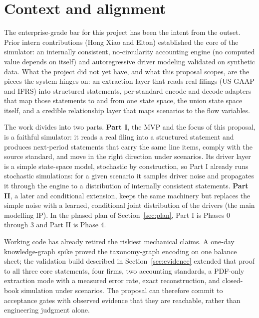 \documentclass[11pt]{article}
\begin{document}
\tableofcontents

\section{Context and alignment}
The enterprise-grade bar for this project has been the intent from the outset. Prior intern contributions (Hong Xiao and Elton) established the core of the simulator: an internally consistent, no-circularity accounting engine (no computed value depends on itself) and autoregressive driver modeling validated on synthetic data. What the project did not yet have, and what this proposal scopes, are the pieces the system hinges on: an extraction layer that reads real filings (US GAAP and IFRS) into structured statements, per-standard encode and decode adapters that map those statements to and from one state space, the union state space itself, and a credible relationship layer that maps scenarios to the flow variables.

The work divides into two parts. \textbf{Part I}, the MVP and the focus of this proposal, is a faithful simulator: it reads a real filing into a structured statement and produces next-period statements that carry the same line items, comply with the source standard, and move in the right direction under scenarios. Its driver layer is a simple state-space model, stochastic by construction, so Part I already runs stochastic simulations: for a given scenario it samples driver noise and propagates it through the engine to a distribution of internally consistent statements. \textbf{Part II}, a later and conditional extension, keeps the same machinery but replaces the simple noise with a learned, conditional joint distribution of the drivers (the main modelling IP). In the phased plan of Section~\ref{sec:plan}, Part I is Phases 0 through 3 and Part II is Phase 4.

Working code has already retired the riskiest mechanical claims. A one-day knowledge-graph spike proved the taxonomy-graph encoding on one balance sheet; the validation build described in Section~\ref{sec:evidence} extended that proof to all three core statements, four firms, two accounting standards, a PDF-only extraction mode with a measured error rate, exact reconstruction, and closed-book simulation under scenarios. The proposal can therefore commit to acceptance gates with observed evidence that they are reachable, rather than engineering judgment alone.

\end{document}
